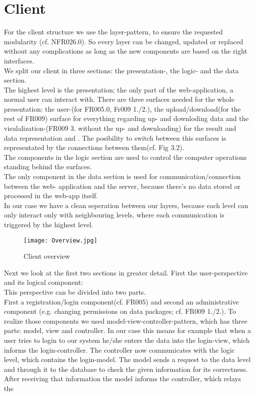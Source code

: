 \documentclass{book}
\begin{document}
\section{Client} 
For the client structure we use the layer-pattern, to  ensure the requested modularity (cf. NFR026.0).
So every layer can be changed, updated or replaced without any complications as long as
 the new components are based on the right interfaces.\\
We split our client in three sections: the presentation-, the logic- and the data section.\\
The highest level is the presentation; the only part of the web-application, a normal user
can interact with. There are three surfaces needed for the whole presentation: 
the user-(for FR005.0, Fr009 1./2.), the upload/download(for the rest of FR009) surface for everything
regarding up- and downloding data and the visulalization-(FR009 3. without the up- and downloading)
for the result and data representation and . The posibility to switch between this surfaces is 
representated by the connections between them(cf. Fig 3.2).\\
The components in the logic section are used to control the computer operations standing behind the
surfaces.\\
The only component in the data section is used for communication/connection between the web- application
and the server, because there's no data stored or processed in the web-app itself.\\
In our case we have a clean seperation between our layers, because each level can only interact only
with neighbouring levels, where each communication is triggered by the highest level.
\begin{figure}[H]
\centering
\texttt{[image: Overview.jpg]}
\caption{Client overview}
\label{Fig. 3}
\end{figure}
Next we look at the first two sections in greater detail. First the user-perspective and its logical component:\\ This perspective can be divided into two parts.\\ First a registration/login component(cf. FR005) and second an administrative component (e.g. changing permissions on data packages; cf. FR009 1./2.). To realize those components we used model-view-controller-pattern, which has three parts: model, view and controller. In our case this means for example that when a user tries to login to our system he/she enters the data into the login-view, which informs the login-controller. The controller now communicates with the logic level, which contains the login-model. The model sends a request to the data level and through it to the database to check the given information for its correctness. After receiving that information the model informs the controller, which relays the  
\end{document}
